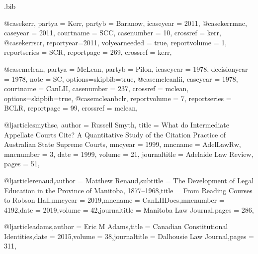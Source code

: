 \begin{filecontents*}[overwrite]{\jobname.bib}

@case{kerr,
  partya = {Kerr}, 
  partyb = {Baranow},
  icaseyear = {2011},
  }
@case{kerrmnc,
  caseyear = {2011},
  courtname = {SCC},
  casenumber = {10},
  crossref = {kerr},
  }
@case{kerrscr,
  reportyear={2011},
  volyearneeded = {true},
  reportvolume = {1},
  reportseries = {SCR},
  reportpage = {269},
  crossref = {kerr},
  	}





@case{mclean,
  partya = {McLean}, 
  partyb = {Pilon},
  icaseyear = {1978},
  decisionyear = {1978},
  note = {SC},
  options={skipbib=true},
  }
@case{mcleanlii,
  caseyear = {1978},
  courtname = {CanLII},
  casenumber = {237},
  crossref = {mclean},
  options={skipbib=true},
  }
@case{mcleanbclr,
  reportvolume = {7},
  reportseries = {BCLR},
  reportpage = {99},
  crossref = {mclean},
  	}








@ljarticle{smythsc,
author = {Russell Smyth},
title = {What do Intermediate Appellate Courts Cite? A Quantitative Study of the Citation Practice of Australian State Supreme Courts},
mncyear = {1999},
mncname = {AdelLawRw},
mncnumber = {3},
date = {1999},
volume = {21},
journaltitle = {Adelaide Law Review},
pages = {51},
}

@ljarticle{renaud,author = {Matthew Renaud},subtitle = {The Development of Legal Education in the Province of Manitoba, 1877–1968},title = {From Reading Courses to Robson Hall},mncyear = {2019},mncname = {CanLIIDocs},mncnumber = {4192},date = {2019},volume = {42},journaltitle = {Manitoba Law Journal},pages = {286},}

@ljarticle{adams,author = {Eric M Adams},title = {Canadian Constitutional Identities},date = {2015},volume = {38},journaltitle = {Dalhousie Law Journal},pages = {311},}



\end{filecontents*}
